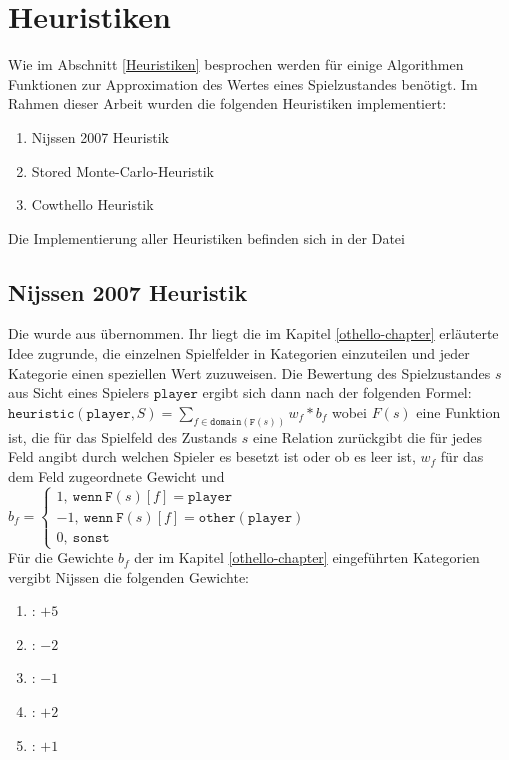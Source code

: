 \section{Heuristiken}
Wie im Abschnitt \ref{Heuristiken} besprochen werden für einige Algorithmen Funktionen zur Approximation des Wertes eines Spielzustandes benötigt. Im Rahmen dieser Arbeit wurden die folgenden Heuristiken implementiert:
\begin{enumerate}
\item Nijssen 2007 Heuristik
\item Stored Monte-Carlo-Heuristik
\item Cowthello Heuristik
\end{enumerate}
Die Implementierung aller Heuristiken befinden sich in der Datei 
\subsection{Nijssen 2007 Heuristik}
Die  wurde aus \cite{nijssen_2007} übernommen. Ihr liegt die im Kapitel \ref{othello-chapter} erläuterte Idee zugrunde, die einzelnen Spielfelder in Kategorien einzuteilen und jeder Kategorie einen speziellen Wert zuzuweisen. Die Bewertung des Spielzustandes $s$ aus Sicht eines Spielers $\mathtt{player}$ ergibt sich dann nach der folgenden Formel: $\mathtt{heuristic}(\mathtt{player}, S) = \sum\limits_{f \in \mathtt{domain}(\mathtt{F}(s))}  w_{f} * b_{f}$ wobei $F(s)$ eine Funktion ist, die für das Spielfeld des Zustands $s$ eine Relation zurückgibt die für jedes Feld angibt durch welchen Spieler es besetzt ist oder ob es leer ist, $w_{f}$ für das dem Feld zugeordnete Gewicht und $b_{f} = \begin{cases} 1 \mathtt{,\ wenn\ F}(s)[f] = \mathtt{player} \\ -1 \mathtt{,\ wenn\ F}(s)[f] = \mathtt{other(player)} \\ 0 \mathtt{,\ sonst} \end{cases}$
\\Für die Gewichte $b_{f}$ der im Kapitel \ref{othello-chapter} eingeführten Kategorien vergibt Nijssen die folgenden Gewichte:
\begin{enumerate}
\item {}: $+5$
\item {}: $-2$
\item {}: $-1$
\item {}: $+2$
\item {}: $+1$
\end{enumerate}
